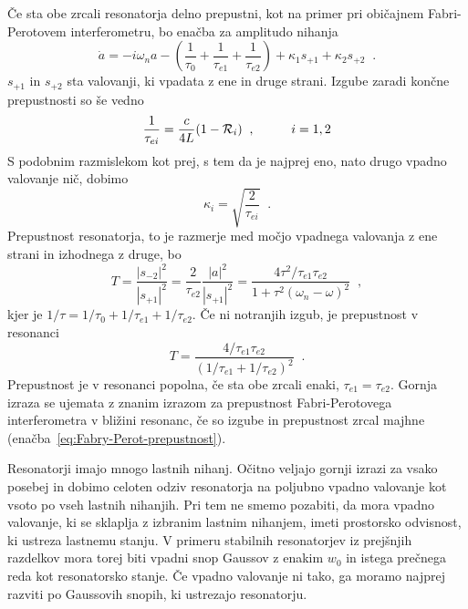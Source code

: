 Če sta obe zrcali resonatorja delno prepustni, kot na primer pri običajnem
Fabri-Perotovem interferometru, bo enačba za amplitudo nihanja 
\begin{equation}
\dot{a}=-i\omega_{n}a-(\frac{1}{\tau_{0}}+\frac{1}{\tau_{e1}}+\frac{1}{\tau_{e2}})+\kappa_{1}s_{+1}+
\kappa_{2}s_{+2}\;\;.\label{3.49}
\end{equation}
 $s_{+1}$ in $s_{+2}$ sta valovanji, ki vpadata z ene in druge strani.
Izgube zaradi končne prepustnosti so še vedno 
\begin{equation}
\frac{1}{\tau_{ei}}=\frac{c}{4L}(1-{\cal R}_{i})\;\;,\mbox{\hskip1cm}i=1,2\label{3.50}
\end{equation}
 S podobnim razmislekom kot prej, s tem da je najprej eno, nato drugo
vpadno valovanje nič, dobimo 
\begin{equation}
\kappa_{i}=\sqrt{\frac{2}{\tau_{ei}}}\;\;.\label{3.51}
\end{equation}
 Prepustnost resonatorja, to je razmerje med močjo vpadnega valovanja
z ene strani in izhodnega z druge, bo 
\begin{equation}
T=\frac{|s_{-2}|^{2}}{|s_{+1}|^{2}}=\frac{2}{\tau_{e2}}\frac{|a|^{2}}{|s_{+1}|^{2}}=\frac{4\tau^{2}/
\tau_{e1}\tau_{e2}}{1+\tau^{2}(\omega_{n}-\omega)^{2}}\;\;,\label{3.52}
\end{equation}
 kjer je $1/\tau=1/\tau_{0}+1/\tau_{e1}+1/\tau_{e2}$. Če ni notranjih
izgub, je prepustnost v resonanci 
\begin{equation}
T=\frac{4/\tau_{e1}\tau_{e2}}{(1/\tau_{e1}+1/\tau_{e2})^{2}}\;\;.\label{3.53}
\end{equation}
 Prepustnost je v resonanci popolna, če sta obe zrcali enaki, $\tau_{e1}=\tau_{e2}$.
Gornja izraza se ujemata z znanim izrazom 
za prepustnost Fabri-Perotovega interferometra v bližini resonanc,
če so izgube in prepustnost zrcal majhne (enačba~\ref{eq:Fabry-Perot-prepustnost}).

Resonatorji imajo mnogo lastnih nihanj. Očitno veljajo gornji izrazi
za vsako posebej in dobimo celoten odziv resonatorja na poljubno vpadno
valovanje kot vsoto po vseh lastnih nihanjih. Pri tem ne smemo pozabiti,
da mora vpadno valovanje, ki se sklaplja z izbranim lastnim nihanjem,
imeti prostorsko odvisnost, ki ustreza lastnemu stanju. V primeru
stabilnih resonatorjev iz prejšnjih razdelkov mora torej biti vpadni
snop Gaussov z enakim $w_{0}$ in istega prečnega reda kot resonatorsko
stanje. Če vpadno valovanje ni tako, ga moramo najprej razviti po
Gaussovih snopih, ki ustrezajo resonatorju.

